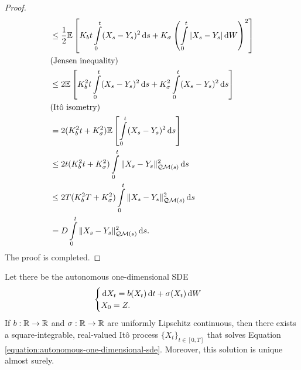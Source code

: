 \begin{proof}
\begin{align*}
     & \le \dfrac{1}{2}\mathbb{E}\left[K_b t\int\limits_0^t (X_s-Y_s)^2\,\mathrm{d} s+K_\sigma\left(\int\limits_0^t |X_s-Y_s|\,\mathrm{d} W\right)^2\right]
    \\
     & \text{(Jensen inequality)}                                                                                                           \\
     & \le 2\mathbb{E}\left[K_b^2 t\int\limits_0^t (X_s-Y_s)^2\,\mathrm{d} s+K_\sigma^2\int\limits_0^t (X_s-Y_s)^2\,\mathrm{d} s\right]                                \\
     & \text{(Itô isometry)}                                                                                                                \\
     & = 2(K_b^2 t+K_\sigma^2)\mathbb{E}\left[\int\limits_0^t (X_s-Y_s)^2\,\mathrm{d} s\right]                                                               \\
     & \le 2t(K_b^2 t+K_\sigma^2)\int\limits_0^t \|X_s-Y_s\|^2_{\mathcal{Q}\mathcal{M}(s)}\,\mathrm{d} s                                                                \\
     & \le 2T(K_b^2 T+K_\sigma^2)\int\limits_0^t \|X_s-Y_s\|^2_{\mathcal{Q}\mathcal{M}(s)}\,\mathrm{d} s                                                                \\
     & = D\int\limits_0^t \|X_s-Y_s\|^2_{\mathcal{Q}\mathcal{M}(s)}\,\mathrm{d} s.
  \end{align*}
  The proof is completed.
\end{proof}

\begin{theorem}
  \label{theorem:existence-and-uniqueness-solution-to-sdes-in-one-dimension}
  Let there be the autonomous one-dimensional SDE
  \begin{equation}
    \label{equation:autonomous-one-dimensional-sde}
    \begin{cases}
      \,\mathrm{d} X_t = b(X_t)\,\mathrm{d} t+\sigma(X_t)\,\mathrm{d} W \\
      X_{0} = Z.
    \end{cases}
  \end{equation}
  If $b:\mathbb{R}\to\mathbb{R}$ and $\sigma:\mathbb{R}\to\mathbb{R}$ are uniformly Lipschitz continuous, then there exists a square-integrable, real-valued Itô process $\{X_t\}_{t\in[0,T]}$ that solves Equation \ref{equation:autonomous-one-dimensional-sde}. Moreover, this solution is unique almost surely.
\end{theorem}

